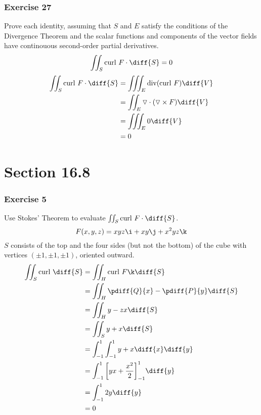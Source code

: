 \documentclass{math}
\begin{document}
\subsubsection*{Exercise 27​}
Prove each identity, assuming that \( S \) and \( E \) satisfy the conditions of
the Divergence Theorem and the scalar functions and components of the vector
fields have continouous second-order partial derivatives.
\[ \iint_{S}\text{curl}~F\cdot\diff{S} = 0 \]
\begin{align*}
  \iint_{S}\text{curl}~F\cdot\diff{S} &=
    \iiint_{E}\text{div}(\text{curl}~F)\diff{V} \\
  &= \iint_{E}\triangledown\cdot(\triangledown\times F)\diff{V} \\
  &= \iiint_{E}0\diff{V} \\
  &= 0
\end{align*}

\section*{Section 16.8}

\subsubsection*{Exercise 5}
Use Stokes' Theorem to evaluate \( \iint_{S}\text{curl}~F\cdot\diff{S} \).
\[ F(x,y,z) = xyz\i+xy\j+x^2yz\k \]
\( S \) consists of the top and the four sides (but not the bottom) of the cube
with vertices \( (\pm1,\pm1,\pm1) \), oriented outward.
\begin{align*}
  \iint_{S}\text{curl}~\diff{S} &=
    \iint_{H}\text{curl}~F\k\diff{S} \\
  &= \iint_{H}\pdiff{Q}{x}-\pdiff{P}{y}\diff{S} \\
  &= \iint_{H}y-zx\diff{S} \\
  &= \iint_{S}y+x\diff{S} \\
  &= \int_{-1}^{1}\int_{-1}^{1}y+x\diff{x}\diff{y} \\
  &= \int_{-1}^{1}\bigg[yx+\frac{x^2}{2}\bigg]_{-1}^{1}\diff{y} \\
  &= \int_{-1}^{1}2y\diff{y} \\
  &= 0
\end{align*}
\end{document}
